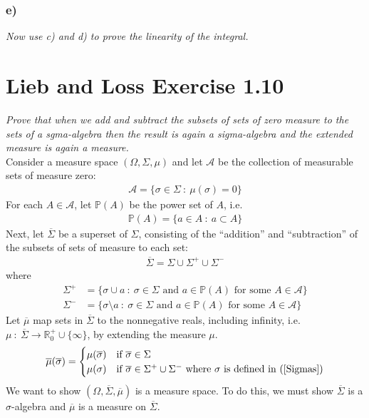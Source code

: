 \documentclass[12pt]{article}
\theoremstyle{plain}
\begin{document}
\subsubsection*{ e)}
\emph{Now use c) and d) to prove the linearity of the integral.}

\section*{Lieb and Loss Exercise 1.10}
\emph{Prove that when we add and subtract the subsets of sets of zero measure to the sets of a sgma-algebra then the result is again a sigma-algebra and the extended measure is again a measure.} \\

Consider a measure space $(\Omega, \Sigma, \mu)$ and let $\mathcal{A}$ be the collection of measurable sets of measure zero:
\begin{align*}
    \mathcal{A} = \{\sigma \in \Sigma\ :\ \mu(\sigma) = 0\}
\end{align*}
For each $A \in \mathcal{A}$, let $\mathbb{P}(A)$ be the power set of $A$, i.e.
\begin{align*}
    \mathbb{P}(A) = \{a \in A\ :\ a \subset A\}
\end{align*}
Next, let $\overline{\Sigma}$ be a superset of $\Sigma$, consisting of the ``addition'' and ``subtraction'' of the subsets of sets of measure to each set:
\begin{align*}
    \overline{\Sigma} = \Sigma \cup \Sigma^+ \cup \Sigma^-
\end{align*}
where
\begin{equation}
    \label{Sigmas}
    \begin{aligned}
        \Sigma^+ &= \{\sigma \cup a\ :\ \sigma \in \Sigma \text{ and } a \in \mathbb{P}(A) \text{ for some } A \in \mathcal{A}\} \\
        \Sigma^- &= \{\sigma \setminus a\ :\ \sigma\in \Sigma \text{ and } a \in \mathbb{P}(A) \text{ for some } A \in \mathcal{A}\}
    \end{aligned}
\end{equation}
Let $\overline{\mu}$ map sets in $\overline{\Sigma}$ to the nonnegative reals, including infinity, i.e.~$\mu\ :\ \overline{\Sigma} \rightarrow \mathbb{R}_0^+ \cup \{\infty\}$, by extending the measure $\mu$.
\begin{align*}
    \overline{\mu}(\overline{\sigma}) = \begin{cases}
        \mu(\overline{\sigma}) & \text{if }\overline{\sigma} \in \Sigma \\
        \mu(\sigma) & \text{if } \overline{\sigma} \in \Sigma^+ \cup \Sigma^- \text{ where $\sigma$ is defined in (\ref{Sigmas})}
    \end{cases}
\end{align*}
We want to show $(\Omega, \overline{\Sigma}, \overline{\mu})$ is a measure space.  To do this, we must show $\overline{\Sigma}$ is a $\sigma$-algebra and $\overline{\mu}$ is a measure on $\overline{\Sigma}$.
\end{document}
